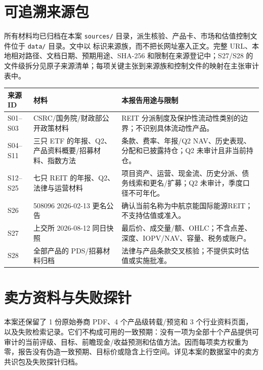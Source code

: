 \section{可追溯来源包}

所有材料均已归档在本案 \texttt{sources/} 目录，派生核验、产品卡、市场和估值控制文件位于 \texttt{data/} 目录。文中以  标识来源族，而不把长网址塞入正文。完整 URL、本地相对路径、文档日期、预期用途、SHA-256 和限制在来源登记中；S27/S28 的文件级拆分见原子来源清单；每项关键主张到来源族和控制文件的映射在主张审计表中。

\begin{exhibitbox}[表 15：来源族与用途]
\small
\begin{tabularx}{\exhibitboxwidth}{L{2.0cm}L{4.0cm}X}
\toprule
\textbf{来源 ID} & \textbf{材料} & \textbf{本报告用途与限制} \\
\midrule
S01--S03 & CSRC/国务院/财政部公开政策材料 & REIT 分派制度及保护性流动性类别的边界；不识别具体流动性产品。\\
S04--S11 & 三只 ETF 的年报、Q2、产品资料概要/招募材料、指数方法 & 条款、费率、年报/Q2 NAV、历史表现、分配和已披露持仓；Q2 未审计且非当前持仓。\\
S12--S25 & 七只 REIT 的年报、Q2、法律与运营材料 & 项目资产、运营、现金流、历史分派、债务线索和更名/扩募；Q2 未审计，季度口径不可年化。\\
S26 & 508096 2026-02-13 更名公告 & 确认当前名称为中航京能国际能源REIT；不支持估值或准入。\\
S27 & 上交所 2026-08-12 同日快照 & 最后价、成交量/额、OHLC；不含点差、深度、IOPV/NAV、容量、税务或账户。\\
S28 & 全部产品的 PDS/招募材料归档 & 法律与产品条款交叉核验；不提供实时估值或实施批准。\\
\bottomrule
\end{tabularx}
\end{exhibitbox}

\section{卖方资料与失败探针}

本案还保留了 1 份原始券商 PDF、4 个产品级转载/预览和 3 个行业资料页面，以及失败检索记录。它们不构成可用的一致预期：没有一项为全部十个产品提供可审计的当前评级、目标、前瞻现金/收益预测和估值方法。因而每项卖方权重为零，报告没有伪造一致预期、目标价或隐含上行空间。详见本案的数据室中的卖方共识包及失败探针归档。


